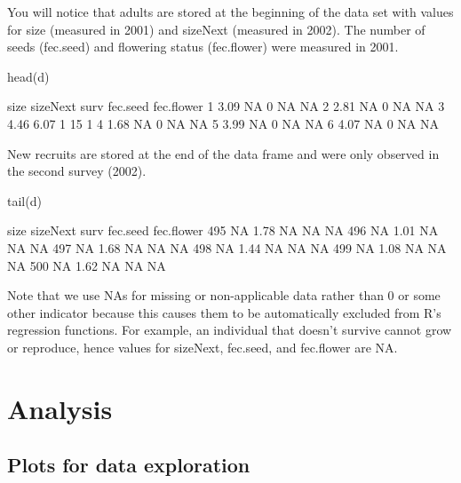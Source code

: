 \documentclass[11pt]{article}
\begin{document}
You will notice that adults are stored at the beginning of the data set with values for size (measured in 2001) and sizeNext (measured in 2002). The number of seeds (fec.seed) and flowering status (fec.flower) were measured in 2001.
\begin{Schunk}
\begin{Sinput}
 head(d)
\end{Sinput}
\begin{Soutput}
  size sizeNext surv fec.seed fec.flower
1 3.09       NA    0       NA         NA
2 2.81       NA    0       NA         NA
3 4.46     6.07    1       15          1
4 1.68       NA    0       NA         NA
5 3.99       NA    0       NA         NA
6 4.07       NA    0       NA         NA
\end{Soutput}
\end{Schunk}

New recruits are stored at the end of the data frame and were only observed in the second survey (2002).

\begin{Schunk}
\begin{Sinput}
 tail(d)
\end{Sinput}
\begin{Soutput}
    size sizeNext surv fec.seed fec.flower
495   NA     1.78   NA       NA         NA
496   NA     1.01   NA       NA         NA
497   NA     1.68   NA       NA         NA
498   NA     1.44   NA       NA         NA
499   NA     1.08   NA       NA         NA
500   NA     1.62   NA       NA         NA
\end{Soutput}
\end{Schunk}

Note that we use NAs for missing or non-applicable data rather than 0 or some other indicator because this causes them to be automatically excluded from R's regression functions. For example, an individual that doesn't survive cannot grow or reproduce, hence values for sizeNext, fec.seed, and fec.flower are NA.

\section{Analysis}
\label{sec:Analysis}

\subsection{Plots for data exploration}
\label{sec:Plots for data exploration}
  
\end{document}
